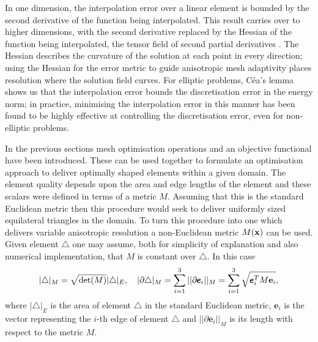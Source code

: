 In one dimension, the interpolation error over a linear element is
bounded by the second derivative of the function being
interpolated. This result carries over to higher dimensions, with the
second derivative replaced by the Hessian of the function being
interpolated, the tensor field of second partial derivatives
\citep{frey2005}. The Hessian describes the curvature of the solution
at each point in every direction; using the Hessian for the error
metric to guide anisotropic mesh adaptivity places resolution where
the solution field curves. For elliptic problems, C\'ea's lemma shows
us that the interpolation error bounds the discretisation error in the
energy norm; in practice, minimising the interpolation error in this
manner has been found to be highly effective at controlling the
discretisation error, even for non-elliptic problems.

In the previous sections mesh optimisation operations and an objective
functional have been introduced.  These can be used together to
formulate an optimisation approach to deliver optimally shaped
elements within a given domain. The element quality depends upon the
area and edge lengths of the element and these scalars were defined in
terms of a metric $M$. Assuming that this is the standard Euclidean
metric then this procedure would seek to deliver uniformly sized
equilateral triangles in the domain. To turn this procedure into one
which delivers variable anisotropic resolution a non-Euclidean metric
$M({\bf x})$ can be used. Given element $\triangle$ one may assume,
both for simplicity of explanation and also numerical implementation,
that $M$ is constant over $\triangle$. In this case
\begin{equation*}
|\triangle|_M = \sqrt{\textrm{det}(M)}|\triangle|_E,\quad
|\partial \triangle|_M = \sum_{i=1}^{3} ||\partial \pmb{e}_i||_M = \sum_{i=1}^{3} \sqrt{\pmb{e}_i^T M {\bf e}_i},
\end{equation*}
where $|\triangle|_E$ is the area of element $\triangle$ in the
standard Euclidean metric, $\pmb{e}_i$ is the vector representing the
$i$-th edge of element $\triangle$ and $||\partial \pmb{e}_i||_M$ is
its length with respect to the metric $M$.


